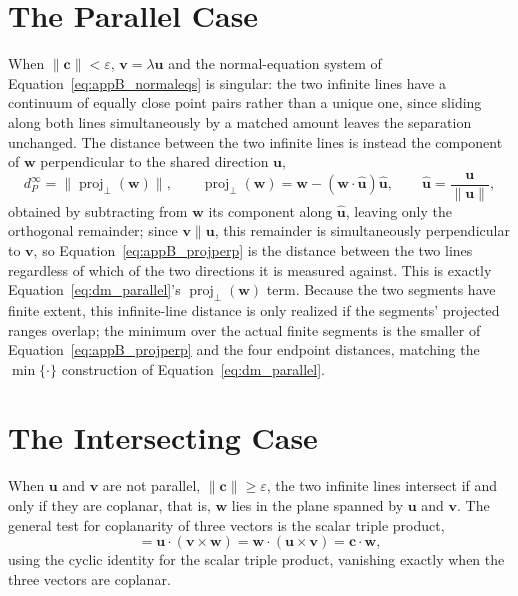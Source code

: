 \section{The Parallel Case}\label{sec:appB_parallel}

When $\lVert\mathbf{c}\rVert < \varepsilon$, $\mathbf{v} = \lambda\mathbf{u}$ and the normal-equation
system of Equation~\eqref{eq:appB_normaleqs} is singular: the two infinite lines have a continuum of
equally close point pairs rather than a unique one, since sliding along both lines simultaneously by
a matched amount leaves the separation unchanged. The distance between the two infinite lines is
instead the component of $\mathbf{w}$ perpendicular to the shared direction $\mathbf{u}$,
\begin{equation}
d_P^{\infty} = \lVert \operatorname{proj}_{\perp}(\mathbf{w}) \rVert, \qquad
\operatorname{proj}_{\perp}(\mathbf{w}) = \mathbf{w} - (\mathbf{w}\cdot\hat{\mathbf{u}})\hat{\mathbf{u}},
\qquad \hat{\mathbf{u}} = \frac{\mathbf{u}}{\lVert\mathbf{u}\rVert},
\label{eq:appB_projperp}
\end{equation}
obtained by subtracting from $\mathbf{w}$ its component along $\hat{\mathbf{u}}$, leaving only the
orthogonal remainder; since $\mathbf{v} \parallel \mathbf{u}$, this remainder is simultaneously
perpendicular to $\mathbf{v}$, so Equation~\eqref{eq:appB_projperp} is the distance between the two
lines regardless of which of the two directions it is measured against. This is exactly
Equation~\eqref{eq:dm_parallel}'s $\operatorname{proj}_{\perp}(\mathbf{w})$ term. Because the two
segments have finite extent, this infinite-line distance is only realized if the segments' projected
ranges overlap; the minimum over the actual finite segments is the smaller of
Equation~\eqref{eq:appB_projperp} and the four endpoint distances, matching the $\min\{\cdot\}$
construction of Equation~\eqref{eq:dm_parallel}.

\section{The Intersecting Case}\label{sec:appB_intersect}

When $\mathbf{u}$ and $\mathbf{v}$ are not parallel, $\lVert\mathbf{c}\rVert \geq \varepsilon$, the
two infinite lines intersect if and only if they are coplanar, that is, $\mathbf{w}$ lies in the
plane spanned by $\mathbf{u}$ and $\mathbf{v}$. The general test for coplanarity of three vectors is
the scalar triple product,
\begin{equation}
[\mathbf{u},\mathbf{v},\mathbf{w}] = \mathbf{u}\cdot(\mathbf{v}\times\mathbf{w})
= \mathbf{w}\cdot(\mathbf{u}\times\mathbf{v}) = \mathbf{c}\cdot\mathbf{w},
\label{eq:appB_triple}
\end{equation}
using the cyclic identity for the scalar triple product, vanishing exactly when the three vectors
are coplanar.

